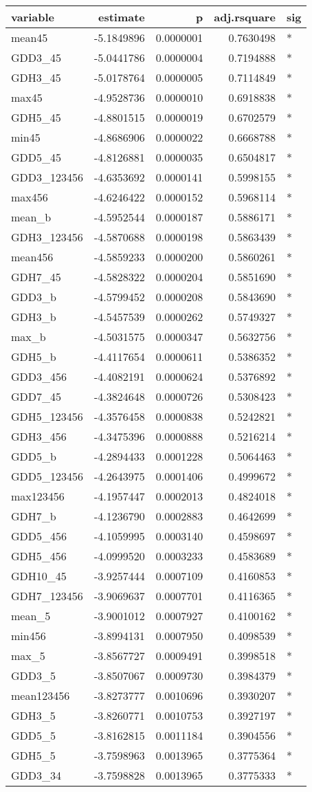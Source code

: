 \documentclass[10pt,]{article}
\begin{document}
\begin{longtable}[]{@{}lrrrl@{}}
\toprule
variable & estimate & p & adj.rsquare & sig\tabularnewline
\midrule
\endhead
mean45 & -5.1849896 & 0.0000001 & 0.7630498 & *\tabularnewline
GDD3\_45 & -5.0441786 & 0.0000004 & 0.7194888 & *\tabularnewline
GDH3\_45 & -5.0178764 & 0.0000005 & 0.7114849 & *\tabularnewline
max45 & -4.9528736 & 0.0000010 & 0.6918838 & *\tabularnewline
GDH5\_45 & -4.8801515 & 0.0000019 & 0.6702579 & *\tabularnewline
min45 & -4.8686906 & 0.0000022 & 0.6668788 & *\tabularnewline
GDD5\_45 & -4.8126881 & 0.0000035 & 0.6504817 & *\tabularnewline
GDD3\_123456 & -4.6353692 & 0.0000141 & 0.5998155 & *\tabularnewline
max456 & -4.6246422 & 0.0000152 & 0.5968114 & *\tabularnewline
mean\_b & -4.5952544 & 0.0000187 & 0.5886171 & *\tabularnewline
GDH3\_123456 & -4.5870688 & 0.0000198 & 0.5863439 & *\tabularnewline
mean456 & -4.5859233 & 0.0000200 & 0.5860261 & *\tabularnewline
GDH7\_45 & -4.5828322 & 0.0000204 & 0.5851690 & *\tabularnewline
GDD3\_b & -4.5799452 & 0.0000208 & 0.5843690 & *\tabularnewline
GDH3\_b & -4.5457539 & 0.0000262 & 0.5749327 & *\tabularnewline
max\_b & -4.5031575 & 0.0000347 & 0.5632756 & *\tabularnewline
GDH5\_b & -4.4117654 & 0.0000611 & 0.5386352 & *\tabularnewline
GDD3\_456 & -4.4082191 & 0.0000624 & 0.5376892 & *\tabularnewline
GDD7\_45 & -4.3824648 & 0.0000726 & 0.5308423 & *\tabularnewline
GDH5\_123456 & -4.3576458 & 0.0000838 & 0.5242821 & *\tabularnewline
GDH3\_456 & -4.3475396 & 0.0000888 & 0.5216214 & *\tabularnewline
GDD5\_b & -4.2894433 & 0.0001228 & 0.5064463 & *\tabularnewline
GDD5\_123456 & -4.2643975 & 0.0001406 & 0.4999672 & *\tabularnewline
max123456 & -4.1957447 & 0.0002013 & 0.4824018 & *\tabularnewline
GDH7\_b & -4.1236790 & 0.0002883 & 0.4642699 & *\tabularnewline
GDD5\_456 & -4.1059995 & 0.0003140 & 0.4598697 & *\tabularnewline
GDH5\_456 & -4.0999520 & 0.0003233 & 0.4583689 & *\tabularnewline
GDH10\_45 & -3.9257444 & 0.0007109 & 0.4160853 & *\tabularnewline
GDH7\_123456 & -3.9069637 & 0.0007701 & 0.4116365 & *\tabularnewline
mean\_5 & -3.9001012 & 0.0007927 & 0.4100162 & *\tabularnewline
min456 & -3.8994131 & 0.0007950 & 0.4098539 & *\tabularnewline
max\_5 & -3.8567727 & 0.0009491 & 0.3998518 & *\tabularnewline
GDD3\_5 & -3.8507067 & 0.0009730 & 0.3984379 & *\tabularnewline
mean123456 & -3.8273777 & 0.0010696 & 0.3930207 & *\tabularnewline
GDH3\_5 & -3.8260771 & 0.0010753 & 0.3927197 & *\tabularnewline
GDD5\_5 & -3.8162815 & 0.0011184 & 0.3904556 & *\tabularnewline
GDH5\_5 & -3.7598963 & 0.0013965 & 0.3775364 & *\tabularnewline
GDD3\_34 & -3.7598828 & 0.0013965 & 0.3775333 & *\tabularnewline

\end{longtable}
\end{document}
